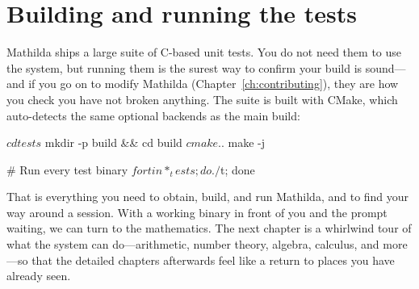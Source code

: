 \section{Building and running the tests}
\label{sec:tests}

Mathilda ships a large suite of C-based unit tests. You do not need them to use the
system, but running them is the surest way to confirm your build is sound---and if
you go on to modify Mathilda (Chapter~\ref{ch:contributing}), they are how you check
you have not broken anything. The suite is built with CMake, which auto-detects the
same optional backends as the main build:

\begin{shell}
$ cd tests
$ mkdir -p build && cd build
$ cmake ..
$ make -j

# Run every test binary
$ for t in *_tests; do ./$t; done
\end{shell}

\bigskip
\noindent
That is everything you need to obtain, build, and run Mathilda, and to find your way
around a session. With a working binary in front of you and the prompt waiting, we
can turn to the mathematics. The next chapter is a whirlwind tour of what the system
can do---arithmetic, number theory, algebra, calculus, and more---so that the
detailed chapters afterwards feel like a return to places you have already seen.
